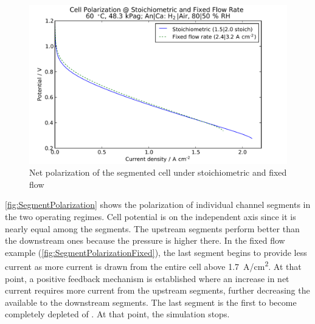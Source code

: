\begin{figure}[htbp]
  \includegraphics[width=\linewidth]{Results/Cell/Model/Segmented/Polarization}%
  \caption{Net polarization of the segmented cell under stoichiometric and fixed flow}%
  \label{fig:SegmentPolarizationNet}
\end{figure}

\autoref{fig:SegmentPolarization} shows the polarization of individual channel segments in the two operating regimes.  Cell potential is on the independent axis since it is nearly equal among the segments. The upstream segments perform better than the downstream ones because the  pressure is higher there.  In the fixed flow example (\autoref{fig:SegmentPolarizationFixed}), the last segment begins to provide less current as more current is drawn from the entire cell above \SI{1.7}{A/cm^2}.  At that point, a positive feedback mechanism is established where an increase in net current requires more current from the upstream segments, further decreasing the  available to the downstream segments.  The last segment is the first to become completely depleted of .  At that point, the simulation stops.


